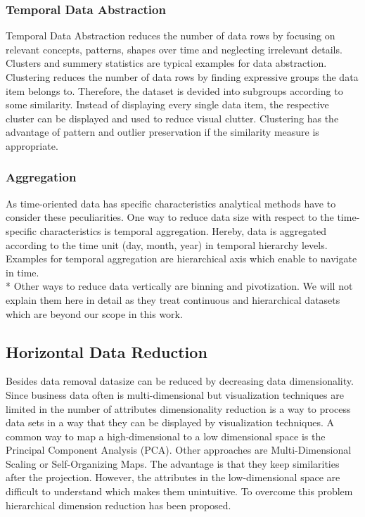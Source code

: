 \subsubsection*{Temporal Data Abstraction}
Temporal Data Abstraction\cite{Aigner2011} reduces the number of data rows by focusing on relevant concepts, patterns, shapes over time and neglecting irrelevant details. Clusters and summery statistics\cite{PiringerHarald2011} are typical examples for data abstraction.
Clustering reduces the number of data rows by finding expressive groups the data item belongs to. Therefore, the dataset is devided into subgroups according to some similarity. Instead of displaying every single data item, the respective cluster can be displayed and used to reduce visual clutter. Clustering has the advantage of pattern and outlier preservation if the similarity measure is appropriate.
\subsubsection*{Aggregation}
As time-oriented data has specific characteristics analytical methods have to consider these peculiarities. One way to reduce data size with respect to the time-specific characteristics is temporal aggregation. Hereby, data is aggregated according to the time unit (day, month, year) in temporal hierarchy levels. Examples for temporal aggregation are hierarchical axis \cite{Chung2014} which enable to navigate in time. 
\\*
Other ways to reduce data vertically are binning and pivotization. We will not explain them here in detail as they treat continuous and hierarchical datasets which are beyond our scope in this work. 

\subsection{Horizontal Data Reduction}
Besides data removal datasize can be reduced by decreasing data dimensionality. Since business data often is multi-dimensional but visualization techniques are limited in the number of attributes dimensionality reduction is a way to process data sets in a way that they can be displayed by visualization techniques. A common way to map a high-dimensional to a low dimensional space is the Principal Component Analysis (PCA)\cite{Aigner2008}. Other approaches are Multi-Dimensional Scaling or Self-Organizing Maps\cite{PiringerHarald2011}. The advantage is that they keep similarities after the projection. However, the attributes in the low-dimensional space are difficult to understand which makes them unintuitive. To overcome this problem hierarchical dimension reduction has been proposed. 



